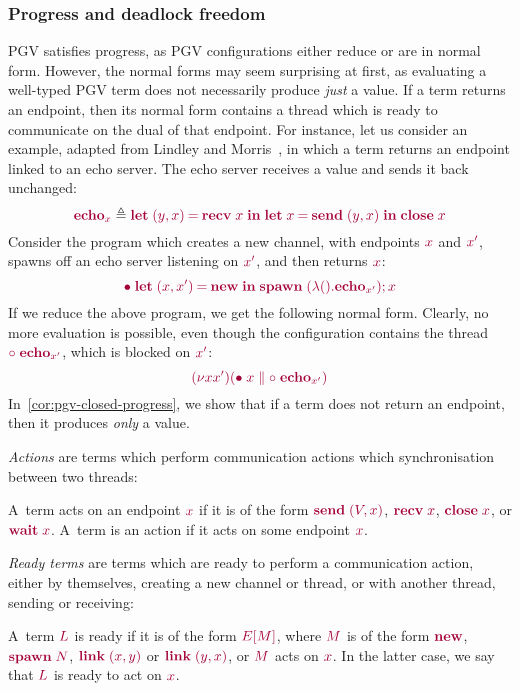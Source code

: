 \documentclass[main.tex]{subfiles}
\begin{document}
\subsubsection*{Progress and deadlock freedom}
PGV satisfies progress, as PGV configurations either reduce or are in normal form. However, the normal forms may seem surprising at first, as evaluating a well-typed PGV term does not necessarily produce \emph{just} a value. If a term returns an endpoint, then its normal form contains a thread which is ready to communicate on the dual of that endpoint. For instance, let us consider an example, adapted from Lindley and Morris~\cite{lindleymorris15}, in which a term returns an endpoint linked to an echo server. The echo server receives a value and sends it back unchanged:
\[
  \tm{\echo_x} \defeq \tm{\letpair{y}{x}{\recv\;{x}}{\letbind{x}{\send\;\pair{y}{x}}{\close\;x}}}
\]
Consider the program which creates a new channel, with endpoints $\tm{x}$ and $\tm{x'}$, spawns off an echo server listening on $\tm{x'}$, and then returns $\tm{x}$:
\[
  \tm{\main\;\letpair{x}{x'}{\new}{\andthen{\spawn\;(\lambda\unit.\echo_{x'})}}{x}}
\]
If we reduce the above program, we get the following normal form. Clearly, no more evaluation is possible, even though the configuration contains the thread $\tm{\child\;\echo_{x'}}$, which is blocked on $\tm{x'}$:
\[
  \tm{\res{x}{x'}{(\ppar{\main\;x}{\child\;\echo_{x'}})}}
\]
In~\cref{cor:pgv-closed-progress}, we show that if a term does not return an endpoint, then it produces \emph{only} a value.

\emph{Actions} are terms which perform communication actions which synchronisation between two threads:
\begin{definition}[Actions]
  \label{def:pgv-actions}
  A~term acts on an endpoint $\tm{x}$ if it is of the form $\tm{\send\;\pair{V}{x}}$, $\tm{\recv\;{x}}$, $\tm{\close\;{x}}$, or $\tm{\wait\;{x}}$. A~term is an action if it acts on some endpoint $\tm{x}$.
\end{definition}

\emph{Ready terms} are terms which are ready to perform a communication action, either by themselves, \eg creating a new channel or thread, or with another thread, \eg sending or receiving:
\begin{definition}
  \label{def:pgv-ready-actions}
  A~term $\tm{L}$ is ready if it is of the form $\tm{\plug{E}{M}}$, where $\tm{M}$ is of the form $\tm{\new}$, $\tm{\spawn\;N}$, $\tm{\link\;\pair{x}{y}}$ or $\tm{\link\;\pair{y}{x}}$, or $\tm{M}$ acts on $\tm{x}$. In the latter case, we say that $\tm{L}$ is ready to act on $\tm{x}$.
\end{definition}
\end{document}
